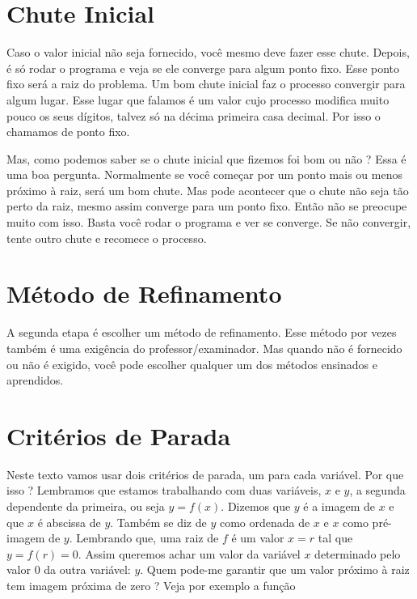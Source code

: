 \documentclass[
  letterpaper,
  DIV=11,
  numbers=noendperiod]{scrreprt}
\begin{document}
\section{Chute Inicial}\label{chute-inicial}

Caso o valor inicial não seja fornecido, você mesmo deve fazer esse
chute. Depois, é só rodar o programa e veja se ele converge para algum
ponto fixo. Esse ponto fixo será a raiz do problema. Um bom chute
inicial faz o processo convergir para algum lugar. Esse lugar que
falamos é um valor cujo processo modifica muito pouco os seus dígitos,
talvez só na décima primeira casa decimal. Por isso o chamamos de ponto
fixo.

Mas, como podemos saber se o chute inicial que fizemos foi bom ou não ?
Essa é uma boa pergunta. Normalmente se você começar por um ponto mais
ou menos próximo à raiz, será um bom chute. Mas pode acontecer que o
chute não seja tão perto da raiz, mesmo assim converge para um ponto
fixo. Então não se preocupe muito com isso. Basta você rodar o programa
e ver se converge. Se não convergir, tente outro chute e recomece o
processo.

\section{Método de Refinamento}\label{muxe9todo-de-refinamento}

A segunda etapa é escolher um método de refinamento. Esse método por
vezes também é uma exigência do professor/examinador. Mas quando não é
fornecido ou não é exigido, você pode escolher qualquer um dos métodos
ensinados e aprendidos.

\section{Critérios de Parada}\label{crituxe9rios-de-parada}

Neste texto vamos usar dois critérios de parada, um para cada variável.
Por que isso ? Lembramos que estamos trabalhando com duas variáveis,
\(x\) e \(y\), a segunda dependente da primeira, ou seja \(y=f(x)\).
Dizemos que \(y\) é a imagem de \(x\) e que \(x\) é abscissa de \(y\).
Também se diz de \(y\) como ordenada de \(x\) e \(x\) como pré-imagem de
\(y\). Lembrando que, uma raiz de \(f\) é um valor \(x=r\) tal que
\(y=f(r)=0\). Assim queremos achar um valor da variável \(x\)
determinado pelo valor 0 da outra variável: \(y\). Quem pode-me garantir
que um valor próximo à raiz tem imagem próxima de zero ? Veja por
exemplo a função
\end{document}
